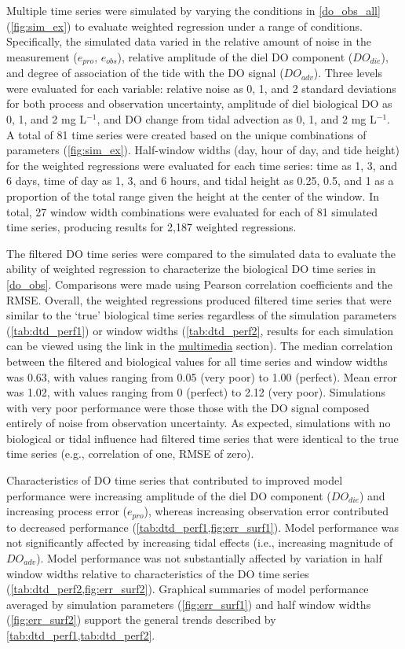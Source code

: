 \documentclass[letterpaper,12pt,oneside]{article}\usepackage[]{graphicx}\usepackage[]{color}
\begin{document}
Multiple time series were simulated by varying the conditions in \cref{do_obs_all} (\cref{fig:sim_ex}) to evaluate weighted regression under a range of conditions. Specifically, the simulated data varied in the relative amount of noise in the measurement ($e_{pro}$, $e_{obs}$), relative amplitude of the diel \ac{DO} component ($DO_{die}$), and degree of association of the tide with the \ac{DO} signal ($DO_{adv}$).  Three levels were evaluated for each variable: relative noise as 0, 1, and 2 standard deviations for both process and observation uncertainty, amplitude of diel biological \ac{DO} as 0, 1, and 2 mg L$^{-1}$, and \ac{DO} change from tidal advection as 0, 1, and 2 mg L$^{-1}$. A total of 81 time series were created based on the unique combinations of parameters (\cref{fig:sim_ex}).  Half-window widths (day, hour of day, and tide height) for the weighted regressions were evaluated for each time series: time as 1, 3, and 6 days, time of day as 1, 3, and 6 hours, and tidal height as 0.25, 0.5, and 1 as a proportion of the total range given the height at the center of the window.  In total, 27 window width combinations were evaluated for each of 81 simulated time series, producing results for 2,187 weighted regressions.

The filtered \ac{DO} time series were compared to the simulated data to evaluate the ability of weighted regression to characterize the biological \ac{DO} time series in \cref{do_obs}. Comparisons were made using Pearson correlation coefficients and the \ac{RMSE}.  Overall, the weighted regressions produced filtered time series that were similar to the `true' biological time series regardless of the simulation parameters (\cref{tab:dtd_perf1}) or window widths (\cref{tab:dtd_perf2}, results for each simulation can be viewed using the link in the \hyperref[multi]{multimedia} section).  The median correlation between the filtered and biological values for all time series and window widths was 0.63, with values ranging from 0.05 (very poor) to 1.00 (perfect).  Mean error was 1.02, with values ranging from 0 (perfect) to 2.12 (very poor).  Simulations with very poor performance were those those with the \ac{DO} signal composed entirely of noise from observation uncertainty. As expected, simulations with no biological or tidal influence had filtered time series that were identical to the true time series (e.g., correlation of one, \ac{RMSE} of zero).  

Characteristics of \ac{DO} time series that contributed to improved model performance were increasing amplitude of the diel \ac{DO} component ($DO_{die}$) and increasing process error ($e_{pro}$), whereas increasing observation error contributed to decreased performance (\cref{tab:dtd_perf1,fig:err_surf1}).  Model performance was not significantly affected by increasing tidal effects (i.e., increasing magnitude of $DO_{adv}$).  Model performance was not substantially affected by variation in half window widths relative to characteristics of the \ac{DO} time series (\cref{tab:dtd_perf2,fig:err_surf2}).  Graphical summaries of model performance averaged by simulation parameters (\cref{fig:err_surf1}) and half window widths (\cref{fig:err_surf2}) support the general trends described by \cref{tab:dtd_perf1,tab:dtd_perf2}.
\end{document}
